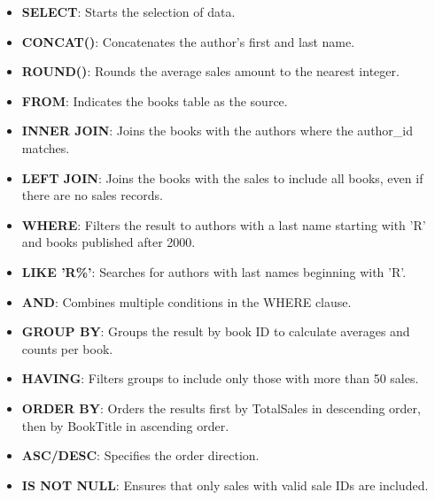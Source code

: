 \begin{itemize}[noitemsep,leftmargin=*]
\leftskip-\dimexpr\leftmargin %
\item[]{\textbf{SELECT}: Starts the selection of data.}
\item[]{\textbf{CONCAT()}: Concatenates the author's first and last name.}
\item[]{\textbf{ROUND()}: Rounds the average sales amount to the nearest integer.}
\item[]{\textbf{FROM}: Indicates the books table as the source.}
\item[]{\textbf{INNER JOIN}: Joins the books with the authors where the author\_id matches.}
\item[]{\textbf{LEFT JOIN}: Joins the books with the sales to include all books, even if there are no sales records.}
\item[]{\textbf{WHERE}: Filters the result to authors with a last name starting with 'R' and books published after 2000.}
\item[]{\textbf{LIKE 'R\%'}: Searches for authors with last names beginning with 'R'.}
\item[]{\textbf{AND}: Combines multiple conditions in the WHERE clause.}
\item[]{\textbf{GROUP BY}: Groups the result by book ID to calculate averages and counts per book.}
\item[]{\textbf{HAVING}: Filters groups to include only those with more than 50 sales.}
\item[]{\textbf{ORDER BY}: Orders the results first by TotalSales in descending order, then by BookTitle in ascending order.}
\item[]{\textbf{ASC/DESC}: Specifies the order direction.}
\item[]{\textbf{IS NOT NULL}: Ensures that only sales with valid sale IDs are included.}
\end{itemize}